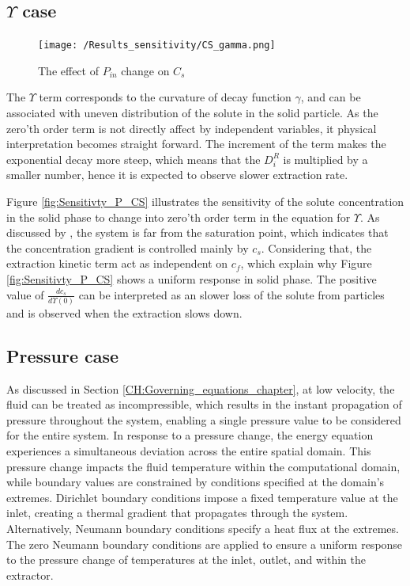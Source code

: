 \documentclass[a4paper,fleqn]{cas-dc}
\begin{document}
	\subsection{$\Upsilon$ case}
	
	\begin{figure}[!ht]
		\centering
		\texttt{[image: /Results\_sensitivity/CS\_gamma.png]}
		\caption{The effect of $P_{in}$ change on $C_s$}
		\label{fig:Sensitivty_Gamma_CS}
	\end{figure}
	
	The $\Upsilon$ term corresponds to the curvature of decay function $\gamma$, and can be associated with uneven distribution of the solute in the solid particle. As the zero'th order term is not directly affect by independent variables, it physical interpretation becomes straight forward. The increment of the term makes the exponential decay more steep, which means that the $D_i^R$ is multiplied by a smaller number, hence it is expected to observe slower extraction rate.
	
	Figure \ref{fig:Sensitivty_P_CS} illustrates the sensitivity of the solute concentration in the solid phase to change into zero'th order term in the equation for $\Upsilon$. As discussed by \citet{Sliczniuk2024}, the system is far from the saturation point, which indicates that the concentration gradient is controlled mainly by $c_s$. Considering that, the extraction kinetic term act as independent on $c_f$, which explain why Figure \ref{fig:Sensitivty_P_CS} shows a uniform response in solid phase. The positive value of $\frac{dc_s}{d\Upsilon(0)}$ can be interpreted as an slower loss of the solute from particles and is observed when the extraction slows down. 
	
	\subsection{Pressure case}
	As discussed in Section \ref{CH:Governing_equations_chapter}, at low velocity, the fluid can be treated as incompressible, which results in the instant propagation of pressure throughout the system, enabling a single pressure value to be considered for the entire system. In response to a pressure change, the energy equation experiences a simultaneous deviation across the entire spatial domain. This pressure change impacts the fluid temperature within the computational domain, while boundary values are constrained by conditions specified at the domain's extremes. Dirichlet boundary conditions impose a fixed temperature value at the inlet, creating a thermal gradient that propagates through the system. Alternatively,  Neumann boundary conditions specify a heat flux at the extremes. The zero Neumann boundary conditions are applied to ensure a uniform response to the pressure change of temperatures at the inlet, outlet, and within the extractor.
		
\end{document}
